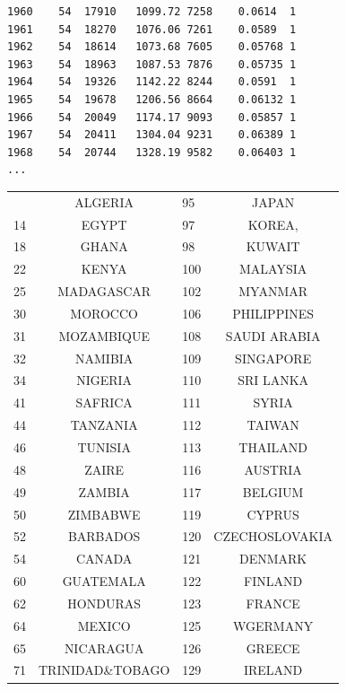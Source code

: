 \documentclass[landscape,letterpaper,9pt]{article}
\begin{document}
\begin{verbatim}
1960    54  17910   1099.72 7258    0.0614  1
1961    54  18270   1076.06 7261    0.0589  1
1962    54  18614   1073.68 7605    0.05768 1
1963    54  18963   1087.53 7876    0.05735 1
1964    54  19326   1142.22 8244    0.0591  1
1965    54  19678   1206.56 8664    0.06132 1
1966    54  20049   1174.17 9093    0.05857 1
1967    54  20411   1304.04 9231    0.06389 1
1968    54  20744   1328.19 9582    0.06403 1
...
\end{verbatim}

\newpage
\begin{center}
\begin{tabular}{|l|c|l|c|}\small
\hline
1 &     ALGERIA     &       95  &JAPAN       \\
14& EGYPT       &       97  &KOREA,      \\
18& GHANA       &       98  &KUWAIT      \\
22& KENYA       &       100 &MALAYSIA    \\
25& MADAGASCAR  &       102 &MYANMAR    \\
30& MOROCCO     &       106 &PHILIPPINES     \\
31& MOZAMBIQUE  &       108 &SAUDI ARABIA    \\
32& NAMIBIA     &       109 &SINGAPORE   \\
34& NIGERIA     &       110 &SRI LANKA   \\
41& SAFRICA     &       111 &SYRIA       \\
44& TANZANIA    &       112 &TAIWAN      \\
46& TUNISIA     &       113 &THAILAND    \\
48& ZAIRE       &       116 &AUSTRIA     \\
49& ZAMBIA      &       117 &BELGIUM    \\
50& ZIMBABWE    &       119 &CYPRUS      \\
52& BARBADOS    &       120 &CZECHOSLOVAKIA  \\
54& CANADA      &       121 &DENMARK     \\
60& GUATEMALA   &       122 &FINLAND    \\
62& HONDURAS    &       123 &FRANCE      \\
64& MEXICO      &       125 &WGERMANY    \\
65& NICARAGUA   &       126 &GREECE      \\
71& TRINIDAD\&TOBAGO&       129 &IRELAND    \\

\end{tabular}
\end{center}
\end{document}

